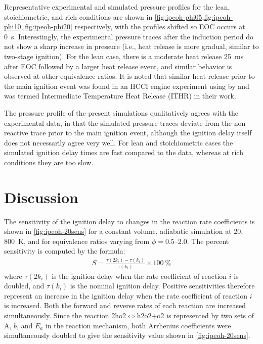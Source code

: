 \documentclass[../main.tex]{subfiles}
\begin{document}
Representative experimental and simulated pressure profiles for the lean,
stoichiometric, and rich conditions are shown in
\cref{fig:ipeoh-phi05,fig:ipeoh-phi10,,fig:ipeoh-phi20} respectively,
with the profiles shifted so EOC occurs at \SI{0}{\second}. Interestingly,
the experimental pressure traces after the induction period do not show
a sharp increase in pressure (i.e., heat release is more gradual,
similar to two-stage ignition). For the lean case, there is a moderate
heat release \SI{25}{\milli\second} after EOC followed by a larger heat
release event, and similar behavior is observed at other equivalence ratios.
It is noted that similar heat release prior to the main ignition event
was found in an HCCI engine experiment using \iPeOH{} by \textcite{Yang2010}
and was termed Intermediate Temperature Heat Release (ITHR) in their
work.

The pressure profile of the present simulations qualitatively
agrees with the experimental data, in that the simulated pressure
traces deviate from the non-reactive trace prior to the main ignition
event, although the ignition delay itself does not necessarily
agree very well. For lean and stoichiometric cases the simulated
ignition delay times are fast compared to the data, whereas at rich
conditions they are too slow.

\section{Discussion}
\label{sec:ipeoh-discussion}

The sensitivity of the ignition delay to changes in the reaction rate
coefficients is shown in \cref{fig:ipeoh-20sens} for a constant volume,
adiabatic simulation at \SI{20}{\atmosphere}, \SI{800}{\kelvin}, and for
equivalence ratios varying from $\phi=\numrange{0.5}{2.0}$. The percent
sensitivity is computed by the formula:
%
\begin{align}
S = \frac{\tau(2k_i)-\tau(k_i)}{\tau(k_i)} \times \SI{100}{\percent}
\end{align}
%
where $\tau(2k_i)$ is the ignition delay when the rate coefficient of
reaction $i$ is doubled, and $\tau(k_i)$ is the nominal ignition delay.
Positive sensitivities therefore represent an increase in the ignition
delay when the rate coefficient of reaction $i$ is increased. Both the
forward and reverse rates of each reaction are increased simultaneously.
Since the reaction 2ho2$\Leftrightarrow$h2o2+o2 is represented by two sets of $\mathrm{A}$, $b$,
and $E_a$ in the reaction mechanism, both Arrhenius coefficients were
simultaneously doubled to give the sensitivity value shown in \cref{fig:ipeoh-20sens}.
\end{document}
